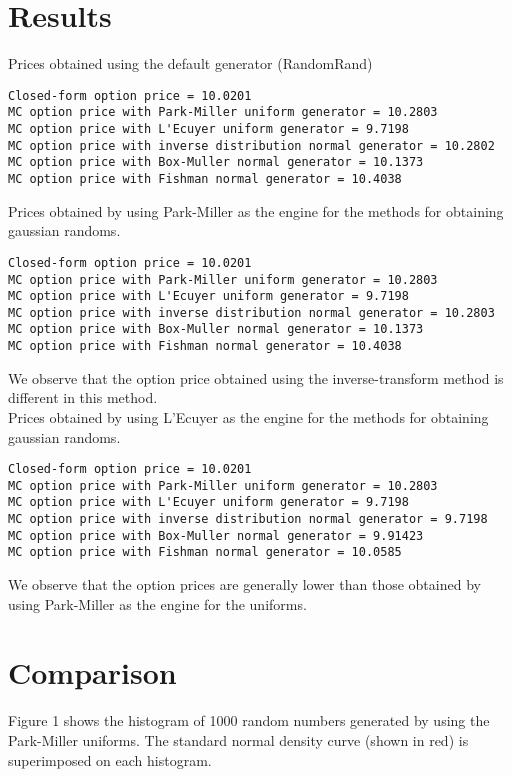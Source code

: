 \documentclass[letterpaper,twoside,11pt,fleqn]{article}
\begin{document}
\section*{Results}
Prices obtained using the default generator (RandomRand)
\begin{verbatim}
Closed-form option price = 10.0201
MC option price with Park-Miller uniform generator = 10.2803
MC option price with L'Ecuyer uniform generator = 9.7198
MC option price with inverse distribution normal generator = 10.2802
MC option price with Box-Muller normal generator = 10.1373
MC option price with Fishman normal generator = 10.4038
\end{verbatim} 


\noindent
Prices obtained by using Park-Miller as the engine for the methods for obtaining gaussian randoms.
\begin{verbatim}
Closed-form option price = 10.0201
MC option price with Park-Miller uniform generator = 10.2803
MC option price with L'Ecuyer uniform generator = 9.7198
MC option price with inverse distribution normal generator = 10.2803
MC option price with Box-Muller normal generator = 10.1373
MC option price with Fishman normal generator = 10.4038
\end{verbatim}
We observe that the option price obtained using the inverse-transform method is different in this method. \\


\noindent
Prices obtained by using L'Ecuyer as the engine for the methods for obtaining gaussian randoms.
\begin{verbatim}
Closed-form option price = 10.0201
MC option price with Park-Miller uniform generator = 10.2803
MC option price with L'Ecuyer uniform generator = 9.7198
MC option price with inverse distribution normal generator = 9.7198
MC option price with Box-Muller normal generator = 9.91423
MC option price with Fishman normal generator = 10.0585
\end{verbatim}
We observe that the option prices are generally lower than those obtained by using Park-Miller as the engine for the uniforms. \\

\section*{Comparison}
Figure 1 shows the histogram of 1000 random numbers generated by using the Park-Miller uniforms.  The standard normal density curve (shown in red) is superimposed on each histogram. \\
\end{document}
